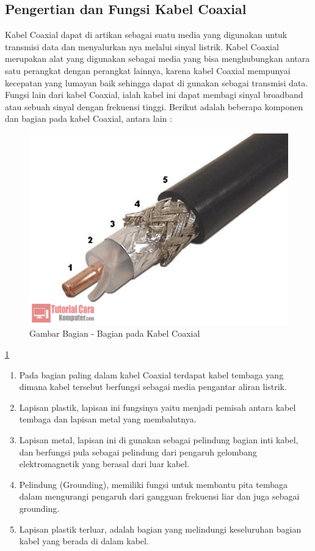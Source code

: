 	\subsection{Pengertian dan Fungsi Kabel Coaxial}
	Kabel Coaxial dapat di artikan sebagai suatu media yang digunakan untuk transmisi data dan menyalurkan nya melalui sinyal listrik. Kabel Coaxial merupakan alat yang digunakan sebagai media yang bisa menghubungkan antara satu perangkat dengan perangkat lainnya, karena kabel Coaxial mempunyai kecepatan yang lumayan baik sehingga dapat di gunakan sebagai transmisi data. Fungsi lain dari kabel Coaxial, ialah kabel ini dapat membagi sinyal broadband atau sebuah sinyal dengan frekuensi tinggi. Berikut adalah beberapa komponen dan bagian pada kabel Coaxial, antara lain :
	\begin{figure} [ht]
	\centerline{\includegraphics[width=1\textwidth]{figures/bgncoax.png}}
	\caption{Gambar Bagian - Bagian pada Kabel Coaxial}
	\label{bgncoax}
	\end{figure}
	
	\ref{bgncoax}
		\begin{enumerate}
			\item Pada bagian paling dalam kabel Coaxial terdapat kabel tembaga yang dimana kabel tersebut berfungsi sebagai media pengantar aliran listrik.
			\item Lapisan plastik, lapisan ini fungsinya yaitu menjadi pemisah antara kabel tembaga dan lapisan metal yang membalutnya.
			\item Lapisan metal, lapisan ini di gunakan sebagai pelindung bagian inti kabel, dan berfungsi pula sebagai pelindung dari pengaruh gelombang elektromagnetik yang berasal dari luar kabel.
			\item Pelindung (Grounding), memiliki fungsi untuk membantu pita tembaga dalam mengurangi pengaruh dari gangguan frekuensi liar dan juga sebagai grounding.
			\item Lapisan plastik terluar, adalah bagian yang melindungi keseluruhan bagian kabel yang berada di dalam kabel.
		\end{enumerate}
		
